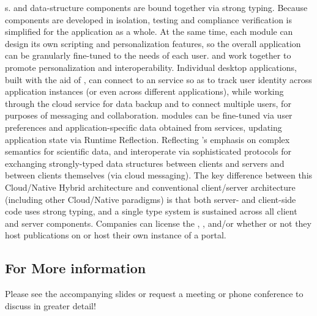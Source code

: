 \documentclass[10pt,letterpaper]{article}
\begin{document}
{\GUI}s.  {\lfGUI} and data-structure components are 
bound together via strong typing.  Because {\VersatileUX} 
components are developed in isolation, testing and 
compliance verification is simplified for the application 
as a whole.  At the same time, each {\VersatileUX} 
module can design its own scripting and personalization 
features, so the overall application can be 
granularly fine-tuned to the needs of each user.
\p{}
{\NDPCloud} and {\VersatileUX} work together to 
promote personalization and interoperability.  
Individual desktop applications, built 
with the aid of {\VersatileUX}, can connect to an 
{\NDPCloud} service so as to track user identity across 
application instances (or even across different applications), 
while working through the cloud service for data backup and 
to connect multiple users, for purposes of 
messaging and collaboration.  
{\VersatileUX} modules can be fine-tuned via 
user preferences and application-specific data obtained from 
{\NDPCloud} services, updating application state via 
Runtime Reflection.  Reflecting {\MOSAIC}'s 
emphasis on complex semantics for scientific data, 
{\NDPCloud} and {\VersatileUX} interoperate via 
sophisticated protocols for exchanging 
strongly-typed data structures between clients and 
servers and between clients themselves (via cloud messaging).  
The key difference between this Cloud/Native Hybrid 
architecture and conventional client/server architecture 
(including other Cloud/Native paradigms) is that 
both server- and client-side code uses 
strong typing, and a single type system is 
sustained across all client and server components.
\p{}
Companies can license the {\MOSAIC} {\SDK}, {\VersatileUX}, and/or 
{\NDPCloud} whether or not they 
host publications on {\MOSAIC} or host their own instance 
of a {\MOSAIC} portal.

\subsection{For More information}
Please see the accompanying slides or request a meeting 
or phone conference to discuss {\MOSAIC} in greater detail!
\end{document}
